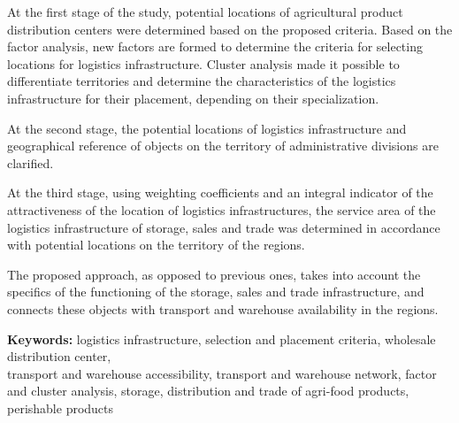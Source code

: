 At the first stage of the study, potential locations of agricultural
product distribution centers were determined based on the proposed
criteria. Based on the factor analysis, new factors are formed to
determine the criteria for selecting locations for logistics
infrastructure. Cluster analysis made it possible to \\differentiate
territories and determine the characteristics of the logistics
infrastructure for their placement, depending on their specialization.

At the second stage, the potential locations of logistics infrastructure
and geographical reference of objects on the territory of administrative
divisions are clarified.

At the third stage, using weighting coefficients and an integral
indicator of the attractiveness of the location of logistics
infrastructures, the service area of the logistics infrastructure of
storage, sales and trade was determined in accordance with potential
locations on the territory of the regions.

The proposed approach, as opposed to previous ones, takes into account
the specifics of the functioning of the storage, sales and trade
infrastructure, and connects these objects with transport and warehouse
availability in the regions.

{\bfseries Keywords:} logistics infrastructure, selection and placement
criteria, wholesale distribution center, \\transport and warehouse
accessibility, transport and warehouse network, factor and cluster
analysis, storage, distribution and trade of agri-food products,
perishable products

